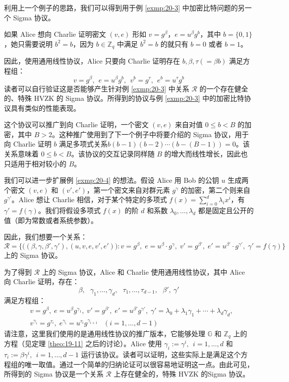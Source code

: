 \begin{example}[加密后的比特 2]\label{exmp:20-5}
利用上一个例子的思路，我们可以得到用于例 \ref{exmp:20-3} 中加密比特问题的另一个 Sigma 协议。

如果 Alice 想向 Charlie 证明密文 $(v,e)$ 形如 $v=g^\beta$，$e=u^\beta g^b$，其中 $b=\{0,1\}$，她只需要说明 $b^2=b$，因为 $b\in\mathbb{Z}_q$ 中满足 $b^2=b$ 的就只有 $b=0$ 或者 $b=1$。

因此，使用通用线性协议，Alice 只要向 Charlie 证明存在 $b,\beta,\tau(=\beta b)$ 满足方程组：
$$
v=g^\beta,~~
e=u^\beta g^b,~~
v^b=g^\tau,~~
e^b=u^\tau g^b
$$
读者可以自行验证这是否能够产生针对例 \ref{exmp:20-3} 中关系 $\mathcal R$ 的一个存在健全的、特殊 HVZK 的 Sigma 协议。所得到的协议与例 \ref{exmp:20-3} 中的加密比特协议具有类似的性能表现。

这个协议可以推广到向 Charlie 证明，一个密文 $(v,e)$ 来自对值 $0\leq b < B$ 的加密，其中 $B>2$。这种推广使用到了下一个例子中将要介绍的 Sigma 协议，用于向 Charlie 证明 $b$ 满足多项式关系$b(b-1)(b-2)\cdots(b-(B-1))=0$。该关系意味着 $0\leq b < B$。该协议的交互记录同样随 $B$ 的增大而线性增长，因此也只适用于相对较小的 $B$。
\end{example}

\begin{example}[多项式关系]\label{exmp:20-6}
我们可以进一步扩展例 \ref{exmp:20-4} 的想法。假设 Alice 用 Bob 的公钥 $u$ 生成两个密文 $(v,e)$ 和 $(v',e')$，第一个密文来自对群元素 $g^\gamma$ 的加密，第二个则来自 $g^{\gamma'}$。Alice 想让 Charlie 相信，对于某个特定的多项式 $f(x)=\sum_{i=0}^d\lambda_ix^i$，有 $\gamma'=f(\gamma)$。我们将假设多项式 $f(x)$ 的阶 $d$ 和系数 $\lambda_0,\dots,\lambda_d$ 都是固定且公开的值（即为常数或者系统参数）。

因此，我们想要一个关系：
$$
\mathcal R=
\bigg\lbrace
\Big((\beta,\gamma,\beta',\gamma'),(u,v,e,v',e')\Big):
v=g^\beta,\;
e=u^\beta\cdot g^\gamma,\;
v'=g^{\beta'},\;
e'=u^{\beta'}\cdot g^{\gamma'},\;
\gamma'=f(\gamma)
\bigg\rbrace
$$
上的 Sigma 协议。

为了得到 $\mathcal R$ 上的 Sigma 协议，Alice 和 Charlie 使用通用线性协议，其中 Alice 向 Charlie 证明，存在：
$$
\beta,~~~
\gamma_1,\dots,\gamma_d,~~~
\tau_1,\dots,\tau_{d-1},~~~
\beta',~
\gamma'
$$
满足方程组：
\begin{equation*}
\begin{aligned}
& v=g^\beta,\;
e=u^\beta g^{\gamma_1},\;
v'=g^{\beta'},\;
e'=u^{\beta'}g^{\gamma'},\;
\gamma'=\lambda_0+\lambda_1\gamma_1+\cdots+\lambda_d\gamma_d,\\
& v^{\gamma_i}=g^{\tau_i},\;
e^{\gamma_i}=u^{\tau_i}g^{\gamma_{i+1}}\;\;\;
(i=1,\dots,d-1)
\end{aligned}
\end{equation*}
请注意，这里我们使用的是通用线性协议的推广版本，它能够处理 $\mathbb G$ 和 $\mathbb{Z}_q$ 上的方程（见定理 \ref{theo:19-11} 之后的讨论）。Alice 使用 $\gamma_i:=\gamma^i,~~i=1,\dots,d$ 和 $\tau_i:=\beta\gamma^i,~~i=1,\dots,d-1$ 运行该协议。读者可以证明，这些实际上是满足这个方程组的唯一取值。通过一个简单的归纳论证可以很容易地证明这一点。由此可见，所得到的 Sigma 协议是一个关系 $\mathcal R$ 上存在健全的，特殊 HVZK 的Sigma 协议。
\end{example}

